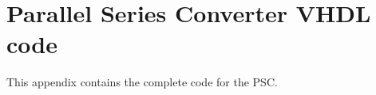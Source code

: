 \chapter{Parallel Series Converter VHDL code} \label{App:PSC_CODE}

This appendix contains the complete code for the PSC.

